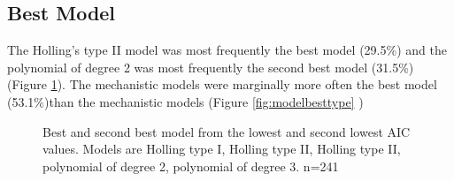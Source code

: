 \documentclass{article}
\begin{document}
\subsection{Best Model}
The Holling's type II model was most frequently the best model (29.5\%) and the polynomial of degree 2 was most frequently the second best model (31.5\%) (Figure \ref{fig:bestmodel}).
The mechanistic models were marginally more often the best model (53.1\%)than the mechanistic models (Figure \ref{fig:modelbesttype} )
\begin{figure}[h]
\centering
{}
\caption{Best and second best model from the lowest and second lowest AIC values. Models are Holling type I, Holling type II, Holling type II, polynomial of degree 2, polynomial of degree 3. n=241}
\label{fig:bestmodel}
\end{figure}
\end{document}
